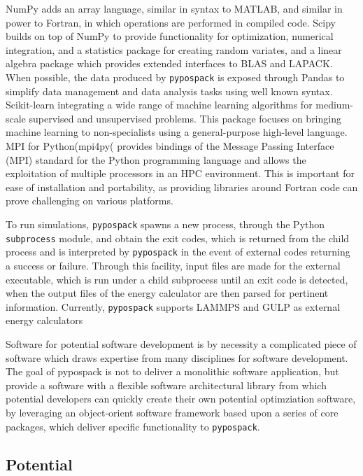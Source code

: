 NumPy\cite{walt2011_numpy} adds an array language, similar in syntax to MATLAB, and similar in power to Fortran, in which operations are performed in compiled code.  
Scipy\cite{jones_scipy} builds on top of NumPy to provide functionality for optimization, numerical integration, and a statistics package for creating random variates, and a linear algebra package which provides extended interfaces to BLAS\cite{blas2002} and LAPACK\cite{anderson1990_lapack}.   
When possible, the data produced by \verb|pypospack| is exposed through Pandas\cite{mckinney2010_pandas} to simplify data management and data analysis tasks using well known syntax.
Scikit-learn\cite{pedregosa2011_sklearn} integrating a wide range of machine learning algorithms for medium-scale supervised and unsupervised problems. This package focuses on bringing machine learning to non-specialists using a general-purpose high-level language.
MPI for Python(mpi4py(\cite{dalcin2005_mpi4py,dalcin2008_mpi4py} provides bindings of the Message Passing Interface (MPI)\cite{mpi2015} standard for the Python programming language and allows the exploitation of multiple processors in an HPC environment.  
This is important for ease of installation and portability, as providing libraries around Fortran code can prove challenging on various platforms.

To run simulations, \verb|pypospack| spawns a new process, through the Python \verb|subprocess| module, and obtain the exit codes, which is returned from the child process and is interpreted by \verb|pypospack| in the event of external codes returning a success or failure.  Through this facility, input files are made for the external executable, which is run under a child subprocess until an exit code is detected, when the output files of the energy calculator are then parsed for pertinent information.  Currently, \verb|pypospack| supports LAMMPS and GULP as external energy calculators

Software for potential software development is by necessity a complicated piece of software which draws expertise from many disciplines for software development.  The goal of pypospack is not to deliver a monolithic software application, but provide a software with a flexible software architectural library from which potential developers can quickly create their own potential optimziation software, by leveraging an object-orient software framework based upon a series of core packages, which deliver specific functionality to \verb|pypospack|.


\subsection{Potential}


